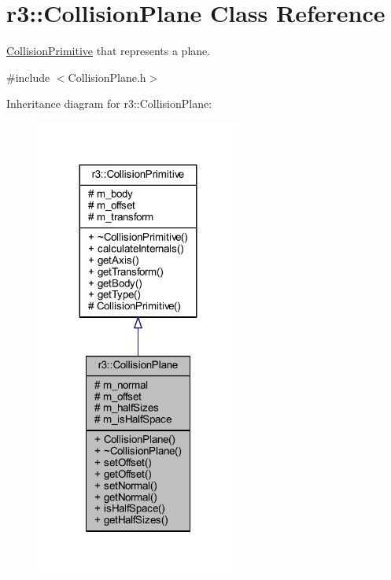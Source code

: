 \hypertarget{classr3_1_1_collision_plane}{}\section{r3\+:\+:Collision\+Plane Class Reference}
\label{classr3_1_1_collision_plane}


\mbox{\hyperlink{classr3_1_1_collision_primitive}{Collision\+Primitive}} that represents a plane.  




{\ttfamily \#include $<$Collision\+Plane.\+h$>$}



Inheritance diagram for r3\+:\+:Collision\+Plane\+:\nopagebreak
\begin{figure}[H]
\begin{center}
\leavevmode
\includegraphics[width=191pt]{classr3_1_1_collision_plane__inherit__graph}
\end{center}
\end{figure}


